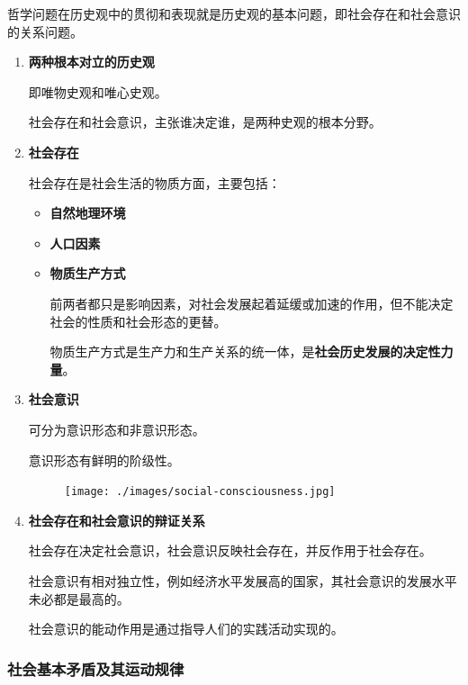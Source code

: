 \documentclass[12pt, a4paper, oneside]{ctexart}
\begin{document}
哲学问题在历史观中的贯彻和表现就是历史观的基本问题，即社会存在和社会意识的关系问题。

\begin{enumerate}
  \item {\bf 两种根本对立的历史观}
  
  即唯物史观和唯心史观。

  社会存在和社会意识，主张谁决定谁，是两种史观的根本分野。

  \item {\bf 社会存在}
  
  社会存在是社会生活的物质方面，主要包括：
  \begin{itemize}
    \item {\bf 自然地理环境}
    \item {\bf 人口因素}
    \item {\bf 物质生产方式}
    
    前两者都只是影响因素，对社会发展起着延缓或加速的作用，但不能决定社会的性质和社会形态的更替。

    物质生产方式是生产力和生产关系的统一体，是\textbf{社会历史发展的决定性力量}。
  \end{itemize}

  \item {\bf 社会意识}
  
  可分为意识形态和非意识形态。

  意识形态有鲜明的阶级性。

  \begin{figure}[h]
    \centering
    \texttt{[image: ./images/social-consciousness.jpg]}
  \end{figure}

  \item {\bf 社会存在和社会意识的辩证关系}

  社会存在决定社会意识，社会意识反映社会存在，并反作用于社会存在。

  社会意识有相对独立性，例如经济水平发展高的国家，其社会意识的发展水平未必都是最高的。

  社会意识的能动作用是通过指导人们的实践活动实现的。

\end{enumerate}

\subsubsection{社会基本矛盾及其运动规律}
\end{document}
